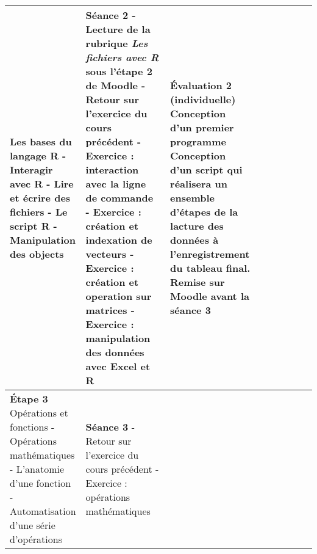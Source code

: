 \documentclass[12]{article}
\begin{document}
\begin{center}
\begin{tabular}{| p{0.1\linewidth} | p{0.3\linewidth} | p{0.3\linewidth} | p{0.3\linewidth} | }
        Les bases du langage R\hfill\hfill \linebreak\linebreak 
            - Interagir avec R\hfill\hfill \linebreak
            - Lire et écrire des fichiers\hfill\hfill \linebreak
            - Le script R\hfill\hfill \linebreak
            - Manipulation des objects\hfill\hfill &
        \textbf{Séance 2} \linebreak
        - Lecture de la rubrique \textit{Les fichiers avec R} sous l'étape 2 de Moodle\hfill\hfill \linebreak
        - Retour sur l'exercice du cours précédent\hfill\hfill \linebreak
        - Exercice : interaction avec la ligne de commande\hfill\hfill \linebreak
        - Exercice : création et indexation de vecteurs\hfill\hfill \linebreak
        - Exercice : création et operation sur matrices\hfill\hfill \linebreak
        - Exercice : manipulation des données avec Excel et R\hfill\hfill &
        \textbf{Évaluation 2} (individuelle) \linebreak
        \textbf{Conception d'un premier programme}\hfill\hfill \linebreak
        Conception d'un script qui réalisera un ensemble d'étapes de la lacture
        des données à l'enregistrement du tableau final. Remise sur Moodle
        avant la séance 3\hfill\hfill\hfill \\
        \hline
        \textbf{Étape 3}
        Opérations et fonctions\hfill\hfill \linebreak\linebreak 
            - Opérations mathématiques\hfill\hfill \linebreak
            - L'anatomie d'une fonction\hfill\hfill \linebreak
            - Automatisation d'une série d'opérations\hfill &
        \textbf{Séance 3} \linebreak
        - Retour sur l'exercice du cours précédent\hfill\hfill \linebreak
        - Exercice : opérations mathématiques\hfill\hfill & 

\end{tabular}
\end{center}
\end{document}
